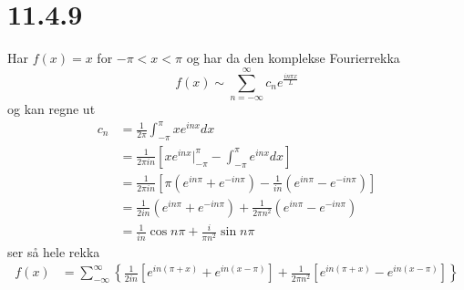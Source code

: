 \documentclass{report}
\newcommand{\nbrack}[1]{\left( #1 \right)}
\newcommand{\bbrack}[1]{\left[ #1 \right]}
\newcommand{\cbrack}[1]{\left\lbrace #1 \right\rbrace}
\begin{document}
\section*{11.4.9}
Har $f(x) = x$ for $-\pi < x < \pi$ og har da den komplekse Fourierrekka
\begin{equation}
  \label{eq:20}
  f(x) \sim \sum_{n=-\infty}^{\infty} c_{n} e^{\frac{in\pi x}{L}}
\end{equation}
og kan regne ut
\begin{equation}
  \label{eq:21}
  \begin{split}
    c_{n} &= \frac{1}{2\pi} \int_{-\pi}^{\pi} xe^{inx} dx \\
          &= \frac{1}{2\pi in} \bbrack{ xe^{inx}\Big|_{-\pi}^{\pi} - \int_{-\pi}^{\pi} e^{inx} dx } \\
          &= \frac{1}{2\pi in} \bbrack{ \pi \nbrack{ e^{in\pi} + e^{-in\pi} } - \frac{1}{in} \nbrack{ e^{in\pi} - e^{-in\pi} } } \\
          &= \frac{1}{2in}\nbrack{ e^{in\pi} + e^{-in\pi} } + \frac{1}{2\pi n^{2}} \nbrack{ e^{in\pi} - e^{-in\pi} } \\
          &= \frac{1}{in} \cos n\pi + \frac{i}{\pi n^{2}} \sin n\pi
  \end{split}
\end{equation}
ser så hele rekka
\begin{equation}
  \label{eq:22}
  \begin{split}
    f(x) &= \sum_{-\infty}^{\infty} \cbrack{ \frac{1}{2in} \bbrack{ e^{in(\pi + x)} + e^{in(x - \pi)} } + \frac{1}{2\pi n^{2}} \bbrack{ e^{in(\pi + x)} - e^{in(x-\pi)} } }
  \end{split}
\end{equation}
\end{document}
